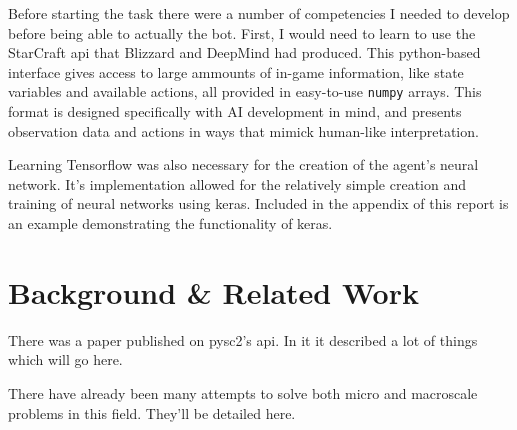\documentclass{amsart}
\newcounter{temp}
\theoremstyle{definition}
\begin{document}
Before starting the task there were a number of competencies I needed to develop before being able to actually the bot.
First, I would need to learn to use the StarCraft api that Blizzard and DeepMind had produced.
This python-based interface gives access to large ammounts of in-game information, like state variables and available actions, all provided in easy-to-use {\tt numpy} arrays.
This format is designed specifically with AI development in mind, and presents observation data and actions in ways that mimick human-like interpretation.

Learning Tensorflow was also necessary for the creation of the agent's neural network.
It's implementation allowed for the relatively simple creation and training of neural networks using keras.
Included in the appendix of this report is an example demonstrating the functionality of keras.








\section{Background \& Related Work}


There was a paper published on pysc2's api.
In it it described a lot of things which will go here.

There have already been many attempts to solve both micro and macroscale problems in this field.
They'll be detailed here.


\end{document}
